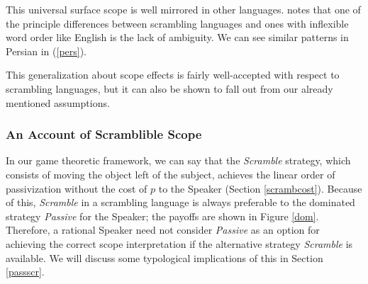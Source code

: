 \documentclass{article}
\begin{document}
This universal surface scope is well mirrored in other languages.
\textcite{karimi03} notes that one of the principle differences between scrambling languages and ones with inflexible word order like English is the lack of ambiguity.
We can see similar patterns in Persian in (\ref{pers}).

\begin{exe}
\ex\label{pers} \begin{xlist}
\end{xlist}\end{exe}

This generalization about scope effects is fairly well-accepted with respect to scrambling languages, but it can also be shown to fall out from our already mentioned assumptions.

\subsubsection{An Account of Scramblible Scope\label{scbad}}

In our game theoretic framework, we can say that the \emph{Scramble} strategy, which consists of moving the object left of the subject, achieves the linear order of passivization without the cost of $p$ to the Speaker (Section \ref{scrambcost}).
	Because of this, \emph{Scramble} in a scrambling language is always preferable to the dominated strategy \emph{Passive} for the Speaker; the payoffs are shown in Figure \ref{dom}.
	Therefore, a rational Speaker need not consider \textit{Passive} as an option for achieving the correct scope interpretation if the alternative strategy \textit{Scramble} is available.
	We will discuss some typological implications of this in Section \ref{passscr}.
\end{document}
